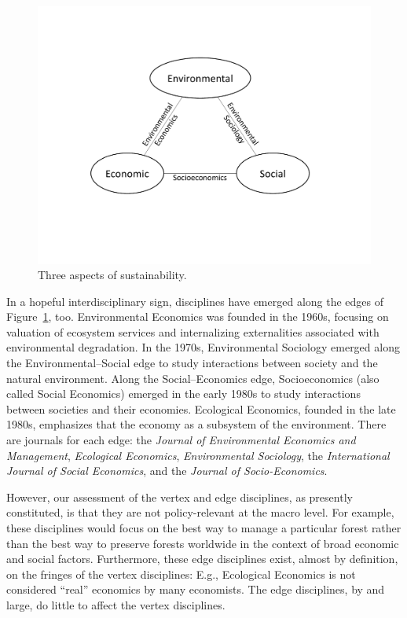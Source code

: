 \documentclass[12pt]{article}
\begin{document}
\begin{figure}
\centering
\includegraphics[width=0.75\linewidth]{figure_other/TriangleDiagram.pdf}
\caption{Three aspects of sustainability.}
\label{fig:3_sustain}
\end{figure}

In a hopeful interdisciplinary sign, 
disciplines have emerged along the edges of Figure~\ref{fig:3_sustain}, too.
Environmental Economics was founded in the 1960s,
focusing on valuation of ecosystem services and 
internalizing externalities associated with environmental degradation.
In the 1970s, Environmental Sociology emerged along the Environmental--Social edge 
to study interactions between society and the natural environment. 
Along the Social--Economics edge, Socioeconomics (also called Social Economics) 
emerged in the early 1980s
to study interactions between societies and their economies.
Ecological Economics, founded in the late 1980s, 
emphasizes that the economy as a subsystem of the environment.
There are journals for each edge:
the \emph{Journal of Environmental Economics and Management}, \emph{Ecological Economics}, 
\emph{Environmental Sociology}, 
the \emph{International Journal of Social Economics}, and the \emph{Journal of Socio-Economics}.

However, our assessment of the vertex and edge disciplines,
as presently constituted,
is that they are not policy-relevant
at the macro level. 
For example, these disciplines would focus on the best way to manage a particular forest 
rather than the best way to preserve forests worldwide
in the context of broad economic and social factors.
Furthermore, these edge disciplines exist, almost by definition, 
on the fringes of the vertex disciplines:
E.g., Ecological Economics is not considered ``real'' economics by many economists.
The edge disciplines, by and large, do little to affect the vertex disciplines.
\end{document}

